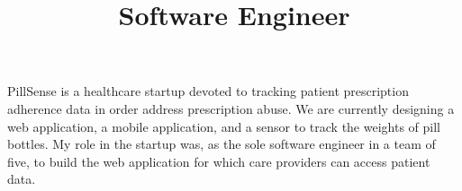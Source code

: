 \documentclass[margin]{res}
\begin{document}
\begin{resume}
\title{\textbf{Software Engineer}}
\begin{position}
PillSense is a healthcare startup devoted to tracking patient prescription adherence
data in order address prescription abuse. We are currently designing a web application,
a mobile application, and a sensor to track the weights of pill bottles. My role in the
startup was, as the sole software engineer in a team of five, to build the web application
for which care providers can access patient data.

\end{position}
\end{resume}
\end{document}
